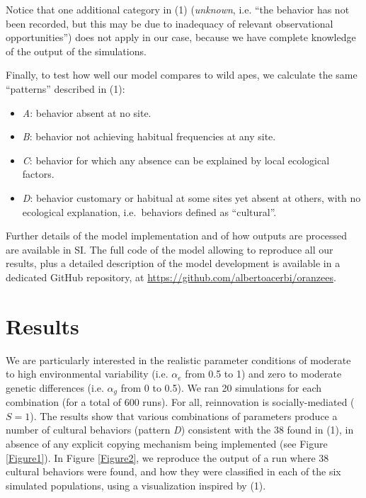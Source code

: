 \documentclass[9pt,twocolumn,twoside,]{pnas-new}
\begin{document}
Notice that one additional category in (1) (\emph{unknown}, i.e. ``the
behavior has not been recorded, but this may be due to inadequacy of
relevant observational opportunities'') does not apply in our case,
because we have complete knowledge of the output of the simulations.

Finally, to test how well our model compares to wild apes, we calculate
the same ``patterns'' described in (1):

\begin{itemize}
\item
  \emph{A}: behavior absent at no site.
\item
  \emph{B}: behavior not achieving habitual frequencies at any site.
\item
  \emph{C}: behavior for which any absence can be explained by local
  ecological factors.
\item
  \emph{D}: behavior customary or habitual at some sites yet absent at
  others, with no ecological explanation, i.e.~behaviors defined as
  ``cultural''.
\end{itemize}

Further details of the model implementation and of how outputs are
processed are available in SI. The full code of the model allowing to
reproduce all our results, plus a detailed description of the model
development is available in a dedicated GitHub repository, at
\url{https://github.com/albertoacerbi/oranzees}.

\hypertarget{results}{%
\section*{Results}\label{results}}

We are particularly interested in the realistic parameter conditions of
moderate to high environmental variability (i.e. \(\alpha_e\) from 0.5
to 1) and zero to moderate genetic differences (i.e. \(\alpha_g\) from 0
to 0.5). We ran 20 simulations for each combination (for a total of 600
runs). For all, reinnovation is socially-mediated (\(S=1\)). The results
show that various combinations of parameters produce a number of
cultural behaviors (pattern \emph{D}) consistent with the 38 found in
(1), in absence of any explicit copying mechanism being implemented (see
Figure \ref{Figure1}). In Figure \ref{Figure2}, we reproduce the output
of a run where 38 cultural behaviors were found, and how they were
classified in each of the six simulated populations, using a
visualization inspired by (1).
\end{document}
